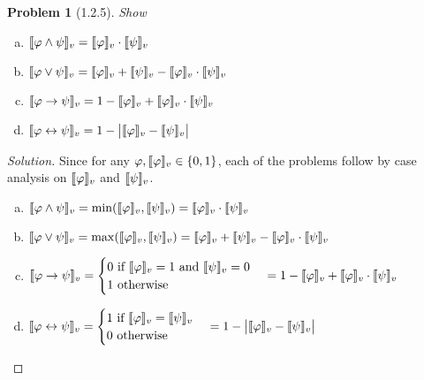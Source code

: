 \documentclass[letter]{article}
\newtheorem{problem}{Problem}
\theoremstyle{definition}
\newenvironment{solution}
{\begin{proof}[Solution]}
        {\end{proof}}
\renewcommand{\phi}{\varphi}
\begin{document}
\begin{problem}[1.2.5]
    Show
 \begin{enumerate}[(a)]
 \item $\den{\phi \land \psi} = \den{\phi} \cdot \den{\psi}$
 \item $\den{\phi \lor \psi} = \den{\phi} + \den{\psi} - \den{\phi} \cdot \den\psi$
 \item $\den{\phi \to \psi} = 1 - \den{\phi} + \den{\phi} \cdot \den{\psi}$
 \item $\den{\phi \leftrightarrow \psi} = 1 - \big|\den{\phi} - \den{\psi} \big|$
 \end{enumerate}
\end{problem}
\begin{solution}
  Since for any $\phi, \den{\phi} \in \{0, 1\}$, each of the problems follow by case analysis on $\den{\phi}$ and $\llbracket \psi \rrbracket_v$.
  \begin{enumerate}[(a)]
  \item
    $\den{\phi \land \psi} = \min(\den{\phi}, \den{\psi}) = \den{\phi} \cdot \den{\psi}$
  \item
    $\den{\phi \lor \psi} = \max(\den{\phi}, \den{\psi}) = \den{\phi} + \den{\psi} - \den{\phi} \cdot \den\psi$
  \item
    $\den{\phi \to \psi} =
    \begin{cases}
      0 \text{ if $\den{\phi} = 1$ and $\den{\psi} = 0$} \\
      1 \text{ otherwise}
    \end{cases}
    = 1 - \den{\phi} + \den{\phi} \cdot \den{\psi}$
  \item
    $\den{\phi \leftrightarrow \psi} =
    \begin{cases}
      1 \text{ if $\den{\phi} = \den{\psi}$} \\
      0 \text{ otherwise}
    \end{cases}
    = 1 - \big|\den{\phi} - \den{\psi} \big|$
  \end{enumerate}
\end{solution}
\end{document}
